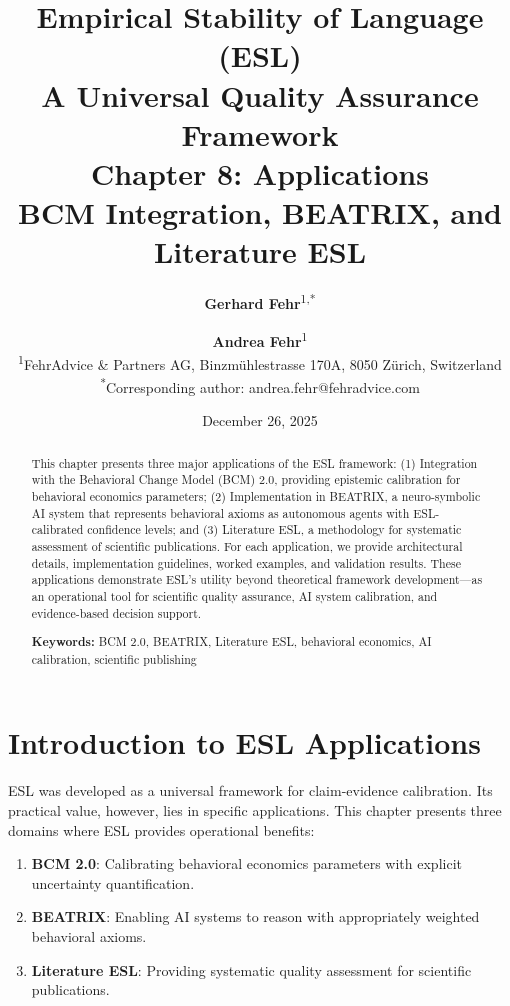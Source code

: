 \documentclass[11pt,a4paper]{article}
\title{%
    \Large \textbf{Empirical Stability of Language (ESL)} \\[0.5em]
    \large A Universal Quality Assurance Framework \\[1em]
    \LARGE \textbf{Chapter 8: Applications} \\[0.3em]
    \large BCM Integration, BEATRIX, and Literature ESL
}
\author{%
    \textbf{Gerhard Fehr}\textsuperscript{1,*} \and \textbf{Andrea Fehr}\textsuperscript{1} \\[0.5em]
    \textsuperscript{1}FehrAdvice \& Partners AG, Binzmühlestrasse 170A, 8050 Zürich, Switzerland \\[0.3em]
    \textsuperscript{*}Corresponding author: andrea.fehr@fehradvice.com
}
\date{December 26, 2025}
\theoremstyle{remark}
\begin{document}
\maketitle

\begin{abstract}
\noindent
This chapter presents three major applications of the ESL framework: (1) Integration with the Behavioral Change Model (BCM) 2.0, providing epistemic calibration for behavioral economics parameters; (2) Implementation in BEATRIX, a neuro-symbolic AI system that represents behavioral axioms as autonomous agents with ESL-calibrated confidence levels; and (3) Literature ESL, a methodology for systematic assessment of scientific publications. For each application, we provide architectural details, implementation guidelines, worked examples, and validation results. These applications demonstrate ESL's utility beyond theoretical framework development---as an operational tool for scientific quality assurance, AI system calibration, and evidence-based decision support.

\vspace{0.5em}
\noindent\textbf{Keywords:} BCM 2.0, BEATRIX, Literature ESL, behavioral economics, AI calibration, scientific publishing
\end{abstract}

\tableofcontents
\newpage

\section{Introduction to ESL Applications}
\label{sec:intro}

ESL was developed as a universal framework for claim-evidence calibration. Its practical value, however, lies in specific applications. This chapter presents three domains where ESL provides operational benefits:

\begin{enumerate}
    \item \textbf{BCM 2.0}: Calibrating behavioral economics parameters with explicit uncertainty quantification.

    \item \textbf{BEATRIX}: Enabling AI systems to reason with appropriately weighted behavioral axioms.

    \item \textbf{Literature ESL}: Providing systematic quality assessment for scientific publications.
\end{enumerate}
\end{document}
